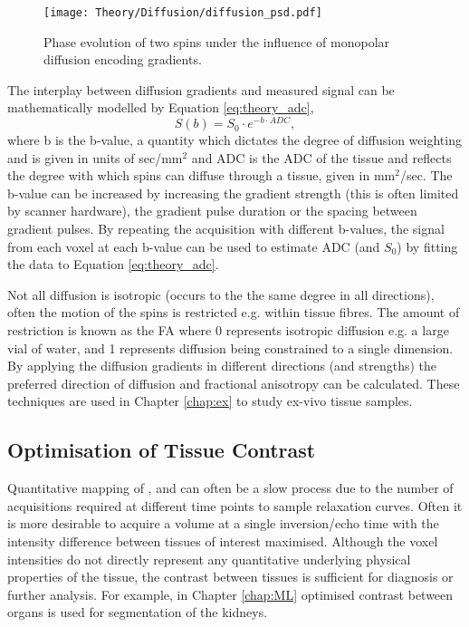 \begin{figure}[H]
	\centering
	\texttt{[image: Theory/Diffusion/diffusion\_psd.pdf]}
	\caption{Phase evolution of two spins under the influence of monopolar diffusion encoding gradients.}
	\label{fig:theory_diffusion_psd}	
\end{figure}

The interplay between diffusion gradients and measured signal can be mathematically modelled by Equation \eqref{eq:theory_adc},
\begin{equation}
	S\left( b \right) = S_0 \cdot e^{-b \cdot ADC},
	\label{eq:theory_adc}
\end{equation}
where b is the b-value, a quantity which dictates the degree of diffusion weighting and is given in units of sec/mm$^2$ and \ac{ADC} is the \acl{ADC} of the tissue and reflects the degree with which spins can diffuse through a tissue, given in mm$^2$/sec. The b-value can be increased by increasing the gradient strength (this is often limited by scanner hardware), the gradient pulse duration or the spacing between gradient pulses. By repeating the acquisition with different b-values, the signal from each voxel at each b-value can be used to estimate \ac{ADC} (and $S_0$) by fitting the data to Equation \eqref{eq:theory_adc}.

Not all diffusion is isotropic (occurs to the the same degree in all directions), often the motion of the spins is restricted e.g. within tissue fibres. The amount of restriction is known as the \ac{FA} where 0 represents isotropic diffusion e.g. a large vial of water, and 1 represents diffusion being constrained to a single dimension. By applying the diffusion gradients in different directions (and strengths) the preferred direction of diffusion and fractional anisotropy can be calculated. These techniques are used in Chapter \ref{chap:ex} to study ex-vivo tissue samples.

\subsection{Optimisation of Tissue Contrast}
Quantitative mapping of \tone, \ttwo and \ttwostar can often be a slow process due to the number of acquisitions required at different time points to sample relaxation curves. Often it is more desirable to acquire a volume at a single inversion/echo time with the intensity difference between tissues of interest maximised. Although the voxel intensities do not directly represent any quantitative underlying physical properties of the tissue, the contrast between tissues is sufficient for diagnosis or further analysis. For example, in Chapter \ref{chap:ML} optimised contrast between organs is used for segmentation of the kidneys.

